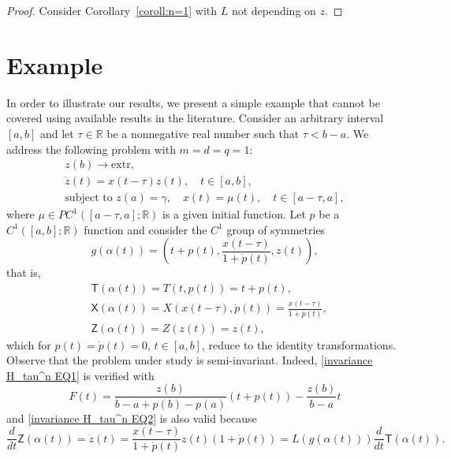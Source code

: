 \documentclass{my-aims}
\theoremstyle{definition}
\begin{document}
\begin{proof}
Consider Corollary~\ref{coroll:n=1} with $L$ not depending on $z$.
\end{proof}


\section{Example}
\label{sec:ex}

In order to illustrate our results, we present a simple example 
that cannot be covered using available results in the literature. 
Consider an arbitrary interval $[a,b]$ and let $\tau \in \mathbb{R}$ 
be a nonnegative real number such that $\tau <b-a$. We address 
the following problem with $m=d=q=1$:
\begin{equation}
\label{eq:prb:ex}
\begin{gathered}
z(b)\rightarrow\mathrm{extr},\\
\dot{z}(t)=x(t-\tau) z(t), \quad t\in[a,b], \\
\text{subject to } z(a)=\gamma, \quad x(t) = \mu(t), \quad t\in[a-\tau,a],
\end{gathered}
\end{equation}
where $\mu \in PC^1([a-\tau,a];\mathbb{R})$ is a given initial function.
Let $p$ be a $C^1([a,b];\mathbb{R})$ function and consider the $C^1$ group of symmetries
\begin{equation*}
g(\alpha(t))=\left(t+p(t),\frac{x(t-\tau)}{1+\dot{p}(t)},z(t)\right),
\end{equation*}
that is, 
\begin{equation*}
\begin{aligned}
&\mathsf{T}(\alpha(t))=T\left(t,p(t)\right) = t + p(t),\\
&\mathsf{X}(\alpha(t))=X\left(x(t-\tau),\dot{p}(t)\right) = \frac{x(t-\tau)}{1+\dot{p}(t)},\\ 
&\mathsf{Z}(\alpha(t))=Z\left(z(t)\right) = z(t),
\end{aligned}
\end{equation*}
which for $p(t) = \dot{p}(t) = 0$, $t\in [a,b]$, reduce to the identity transformations.
Observe that the problem under study is semi-invariant. Indeed, 
\eqref{invariance H_tau^n EQ1} is verified with 
$$
F(t)=\frac{z(b)}{b-a+p(b)-p(a)} \left(t + p(t)\right) -\frac{z(b)}{b-a} t
$$
and \eqref{invariance H_tau^n EQ2} is also valid because
\begin{equation*}
\frac{d}{dt}\mathsf{Z}(\alpha(t))=\dot{z}(t)
=\frac{x(t-\tau)}{1+\dot{p}(t)} z(t) (1+\dot{p}(t)) 
=L(g(\alpha(t)))\frac{d}{dt}\mathsf{T}(\alpha(t)).
\end{equation*}
\end{document}
